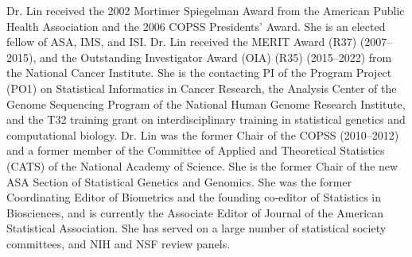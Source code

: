 Dr. Lin received the 2002 Mortimer Spiegelman Award from
the American Public Health Association and the 2006 COPSS Presidents'
Award. She is an elected fellow of ASA, IMS, and ISI. Dr. Lin received
the MERIT Award (R37) (2007--2015), and the Outstanding
Investigator Award (OIA) (R35) (2015--2022) from the National
Cancer Institute. She is the contacting PI of the Program Project
(PO1) on Statistical Informatics in Cancer Research, the Analysis
Center of the Genome Sequencing Program of the National Human Genome
Research Institute, and the T32 training grant on interdisciplinary
training in statistical genetics and computational biology. Dr. Lin
was the former Chair of the COPSS (2010--2012) and a former
member of the Committee of Applied and Theoretical Statistics (CATS)
of the National Academy of Science. She is the former Chair of the new
ASA Section of Statistical Genetics and Genomics. She was the former
Coordinating Editor of Biometrics and the founding co-editor of
Statistics in Biosciences, and is currently the Associate Editor of
Journal of the American Statistical Association. She has served on a
large number of statistical society committees, and NIH and NSF review
panels. \\[2em]

\normalsize

